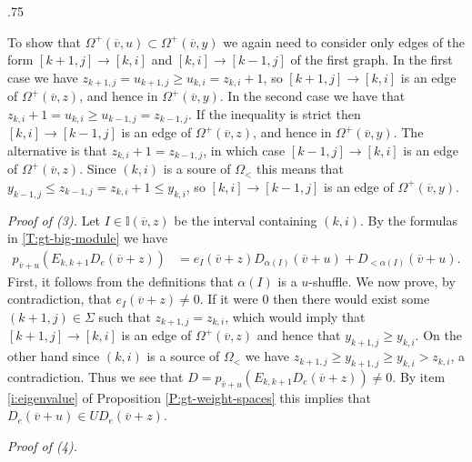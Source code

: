 \documentclass[11pt,fleqn]{amsart}
\makeatletter
\renewcommand\proofname{Proof}
\renewenvironment{proof}[1][\textit{\proofname}]{\par
 \pushQED{\qed}%
 \normalfont \topsep.75\paraskip\relax
 \trivlist
 \item[\hskip\labelsep
 \itshape
 #1\@addpunct{.}]\ignorespaces
}{%
 \popQED\endtrivlist\@endpefalse
}
\newcounter{para}[section]
\renewcommand\to{\rightarrow}
\newcommand\vv{\overline{v}}
\newcommand\II{\mathbb I}
\makeatother
\begin{document}
\begin{proof}
To show that $\Omega^+(\vv, u) \subset \Omega^+(\vv, y)$ we again need to 
consider only edges of the form $[k+1,j] \to [k,i]$ and $[k,i] \to [k-1,j]$ 
of the first graph. In the first case we have $z_{k+1,j} = u_{k+1,j} \geq
u_{k,i} = z_{k,i} + 1$, so $[k+1,j] \to [k,i]$ is an edge of $\Omega^+(\vv,z)$,
and hence in $\Omega^+(\vv,y)$. In the second case we have that $z_{k,i} +1 =
u_{k,i} \geq u_{k-1,j} = z_{k-1,j}$. If the inequality is strict then $[k,i]
\to [k-1,j]$ is an edge of $\Omega^+(\vv,z)$, and hence in $\Omega^+(\vv,y)$.
The alternative is that $z_{k,i} + 1 = z_{k-1,j}$, in which case $[k-1,j]
\to [k,i]$ is an edge of $\Omega^+(\vv,z)$. Since $(k,i)$ is a soure of
$\Omega_<$ this means that $y_{k-1,j} \leq z_{k-1,j} = z_{k,i} + 1 \leq 
y_{k,i}$, so $[k,i] \to [k-1,j]$ is an edge of $\Omega^+(\vv,y)$.

\emph{Proof of (3).} Let $I \in \II(\vv,z)$ be the interval containing 
$(k,i)$. By the formulas in \ref{T:gt-big-module} we have
\begin{align*}
p_{\vv+u}(E_{k,k+1} D_e(\vv + z))
	&= e_I(\vv + z) D_{\alpha(I)}(\vv + u) + D_{<\alpha(I)}(\vv + u).
\end{align*}
First, it follows from the definitions that $\alpha(I)$ is a $u$-shuffle.
We now prove, by contradiction, that $e_I(\vv + z) \neq 0$. If it were $0$
then there would exist some $(k+1,j) \in \Sigma$ such that $z_{k+1,j} = 
z_{k,i}$, which would imply that $[k+1,j] \to [k,i]$ is an edge of 
$\Omega^+(\vv, z)$ and hence that $y_{k+1,j} \geq y_{k,i}$. On the other hand
since $(k,i)$ is a source of $\Omega_<$ we have $z_{k+1,j} \geq y_{k+1,j} \geq 
y_{k,i} > z_{k,i}$, a contradiction. 
Thus we see that $D = p_{\vv+u}(E_{k,k+1} D_e(\vv + z)) \neq 0$. By item 
\ref{i:eigenvalue} of Proposition \ref{P:gt-weight-spaces} this implies that
$D_e(\vv + u) \in U D_e(\vv + z)$.

\emph{Proof of (4).}
\end{proof}
\end{document}
